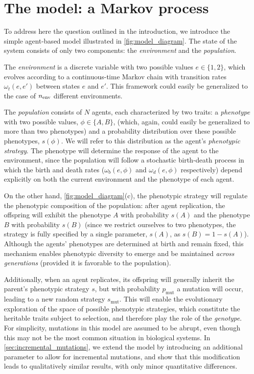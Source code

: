 \documentclass[aps,pre,reprint,10pt,superscriptaddress]{revtex4-2}
\begin{document}
\section{The model: a Markov process} \label{sec:model}

To address here the question outlined in the introduction, we introduce the simple agent-based model illustrated in \cref{fig:model_diagram}. The state of the system consists of only two components: the \emph{environment} and the \emph{population}.

The \emph{environment} is a discrete variable with two possible values  $e\in\{1,2\}$, which evolves according to a continuous-time Markov chain with transition rates $\omega_t(e,e')$ between states $e$ and $e'$. This framework could easily be generalized to the case of $n_{\rm env}$ different environments.

The \emph{population} consists of $N$ agents, each characterized by two traits: a \emph{phenotype} with two possible values, $\phi\in\{A,B\}$, (which, again, could easily be generalized to more than two phenotypes) and a probability distribution over these possible phenotypes, $s(\phi)$. We will refer to this distribution as the agent's \emph{phenotypic strategy}. The phenotype will determine the response of the agent to the environment, since the population will follow a stochastic birth-death process in which the birth and death rates ($\omega_b(e,\phi)$ and $\omega_d(e,\phi)$ respectively) depend explicitly on both the current environment and the phenotype of each agent.

On the other hand, \cref{fig:model_diagram}(c), the phenotypic strategy will regulate the phenotypic composition of the population: after agent replication, the offspring will exhibit the phenotype $A$ with probability $s(A)$ and the phenotype $B$ with probability $s(B)$ (since we restrict ourselves to two phenotypes, the strategy is fully specified by a single parameter, $s(A)$, as $s(B)=1-s(A)$). Although the agents' phenotypes are determined at birth and remain fixed, this mechanism enables phenotypic diversity to emerge and be maintained \emph{across generations} (provided it is favorable to the population).

Additionally, when an agent replicates, its offspring will generally inherit the parent's phenotypic strategy $s$, but with probability $p_\text{mut}$ a mutation will occur, leading to a new random strategy $s_\text{mut}$. This will enable the evolutionary exploration of the space of possible phenotypic strategies, which constitute the heritable traits subject to selection, and therefore play the role of the \emph{genotype}. For simplicity, mutations in this model are assumed to be abrupt, even though this may not be the most common situation in biological systems. In \cref{sec:incremental_mutations}, we extend the model by introducing an additional parameter to allow for incremental mutations, and show that this modification leads to qualitatively similar results, with only minor quantitative differences.
\end{document}
